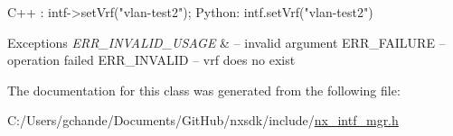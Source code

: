 \begin{DoxyCode}
C++ :
     intf->setVrf(\textcolor{stringliteral}{"vlan-test2"});
Python:
     intf.setVrf(\textcolor{stringliteral}{"vlan-test2"})
\end{DoxyCode}



\begin{DoxyExceptions}{Exceptions}
{\em E\+R\+R\+\_\+\+I\+N\+V\+A\+L\+I\+D\+\_\+\+U\+S\+A\+GE} & -- invalid argument E\+R\+R\+\_\+\+F\+A\+I\+L\+U\+RE -- operation failed E\+R\+R\+\_\+\+I\+N\+V\+A\+L\+ID -- vrf does no exist \\
\hline
\end{DoxyExceptions}


The documentation for this class was generated from the following file\+:\begin{DoxyCompactItemize}
\item 
C\+:/\+Users/gchande/\+Documents/\+Git\+Hub/nxsdk/include/\mbox{\hyperlink{nx__intf__mgr_8h}{nx\+\_\+intf\+\_\+mgr.\+h}}\end{DoxyCompactItemize}
